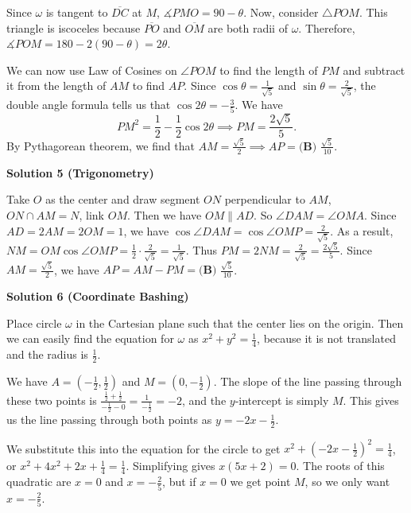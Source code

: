 \begin{enumerate}
 Since $\omega$ is tangent to $\overline{DC}$ at $M$, $\measuredangle PMO = 90 - \theta$. Now, consider $\bigtriangleup POM$. This triangle is iscoceles because $\overline{PO}$ and $\overline{OM}$ are both radii of $\omega$. Therefore, $\measuredangle POM = 180 - 2(90 - \theta) = 2\theta$. 

 We can now use Law of Cosines on $\angle{POM}$ to find the length of ${PM}$ and subtract it from the length of ${AM}$ to find ${AP}$. Since $\cos{\theta} = \frac{1}{\sqrt{5}}$ and $\sin{\theta} = \frac{2}{\sqrt{5}}$, the double angle formula tells us that $\cos{2\theta} = -\frac{3}{5}$. We have
 \[PM^2 = \frac{1}{2} - \frac{1}{2}\cos{2\theta} \implies PM = \frac{2\sqrt{5}}{5}.\]By Pythagorean theorem, we find that $AM = \frac{\sqrt{5}}{2} \implies AP=\boxed{\textbf{(B) } \frac{\sqrt5}{10}}$.

 



\textbf{Solution 5 (Trigonometry)}

Take $O$ as the center and draw segment $ON$ perpendicular to $AM$, $ON\cap AM=N$, link $OM$. Then we have $OM\parallel AD$. So $\angle DAM=\angle OMA$. Since $AD=2AM=2OM=1$, we have $\cos\angle DAM=\cos\angle OMP=\frac{2}{\sqrt{5}}$. As a result, $NM=OM\cos\angle OMP=\frac{1}{2}\cdot \frac{2}{\sqrt{5}}=\frac{1}{\sqrt{5}}.$ Thus $PM=2NM=\frac{2}{\sqrt{5}}=\frac{2\sqrt{5}}{5}$. Since $AM=\frac{\sqrt{5}}{2}$, we have $AP=AM-PM=\boxed{\textbf{(B) } \frac{\sqrt5}{10}}$.

 



\textbf{Solution 6 (Coordinate Bashing)}

Place circle $\omega$ in the Cartesian plane such that the center lies on the origin. Then we can easily find the equation for $\omega$ as $x^2+y^2=\frac{1}{4}$, because it is not translated and the radius is $\frac{1}{2}$. 

 We have $A=\left(-\frac{1}{2}, \frac{1}{2}\right)$ and $M=\left(0, -\frac{1}{2}\right)$. The slope of the line passing through these two points is $\frac{\frac{1}{2}+\frac{1}{2}}{-\frac{1}{2}-0}=\frac{1}{-\frac{1}{2}}=-2$, and the $y$-intercept is simply $M$. This gives us the line passing through both points as $y=-2x-\frac{1}{2}$. 

 We substitute this into the equation for the circle to get $x^2+\left(-2x-\frac{1}{2}\right)^2=\frac{1}{4}$, or $x^2+4x^2+2x+\frac{1}{4}=\frac{1}{4}$. Simplifying gives $x(5x+2)=0$. The roots of this quadratic are $x=0$ and $x=-\frac{2}{5}$, but if $x=0$ we get point $M$, so we only want $x=-\frac{2}{5}$.


\end{enumerate}
